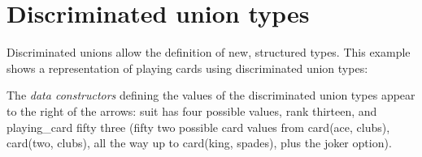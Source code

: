\documentclass[a4paper,11pt,notitlepage,onecolumn]{book}
\begin{document}
\section{Discriminated union types}

Discriminated unions allow the definition of new, structured types.
This example shows a representation of playing cards using discriminated
union types:
\begin{small}

\begin{ptabular}
\nextline
{}
\nextline
{}
\nextline
{}
\nextline
{}
\nextline
\end{ptabular}

\end{small}
The \emph{data constructors} defining the values of the discriminated union
types appear to the right of the arrows: \textsf{suit} has four possible values,
\textsf{rank} thirteen, and \textsf{playing\_card} fifty three (fifty two possible \textsf{card}
values from \textsf{card(ace, clubs)}, \textsf{card(two, clubs)}, all the way up to
\textsf{card(king, spades)}, plus the \textsf{joker} option).
\end{document}

